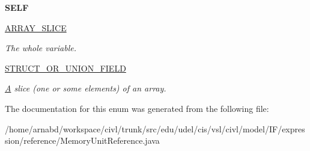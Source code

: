 \begin{DoxyCompactItemize}
\item 
\hypertarget{enumedu_1_1udel_1_1cis_1_1vsl_1_1civl_1_1model_1_1IF_1_1expression_1_1reference_1_1MemoryUnitRef64a306b012808a0db442488810ff9534_a73cad05cb8841a8257e011b8ca34f8e1}{}{\bfseries S\+E\+L\+F}\label{enumedu_1_1udel_1_1cis_1_1vsl_1_1civl_1_1model_1_1IF_1_1expression_1_1reference_1_1MemoryUnitRef64a306b012808a0db442488810ff9534_a73cad05cb8841a8257e011b8ca34f8e1}

\item 
\hypertarget{enumedu_1_1udel_1_1cis_1_1vsl_1_1civl_1_1model_1_1IF_1_1expression_1_1reference_1_1MemoryUnitRef64a306b012808a0db442488810ff9534_a505094c2a9697f44d02c5a1cf858eb4b}{}\hyperlink{enumedu_1_1udel_1_1cis_1_1vsl_1_1civl_1_1model_1_1IF_1_1expression_1_1reference_1_1MemoryUnitRef64a306b012808a0db442488810ff9534_a505094c2a9697f44d02c5a1cf858eb4b}{A\+R\+R\+A\+Y\+\_\+\+S\+L\+I\+C\+E}\label{enumedu_1_1udel_1_1cis_1_1vsl_1_1civl_1_1model_1_1IF_1_1expression_1_1reference_1_1MemoryUnitRef64a306b012808a0db442488810ff9534_a505094c2a9697f44d02c5a1cf858eb4b}

\begin{DoxyCompactList}\small\item\em The whole variable. \end{DoxyCompactList}\item 
\hypertarget{enumedu_1_1udel_1_1cis_1_1vsl_1_1civl_1_1model_1_1IF_1_1expression_1_1reference_1_1MemoryUnitRef64a306b012808a0db442488810ff9534_abcbfb62100872854b061a85ea74d99eb}{}\hyperlink{enumedu_1_1udel_1_1cis_1_1vsl_1_1civl_1_1model_1_1IF_1_1expression_1_1reference_1_1MemoryUnitRef64a306b012808a0db442488810ff9534_abcbfb62100872854b061a85ea74d99eb}{S\+T\+R\+U\+C\+T\+\_\+\+O\+R\+\_\+\+U\+N\+I\+O\+N\+\_\+\+F\+I\+E\+L\+D}\label{enumedu_1_1udel_1_1cis_1_1vsl_1_1civl_1_1model_1_1IF_1_1expression_1_1reference_1_1MemoryUnitRef64a306b012808a0db442488810ff9534_abcbfb62100872854b061a85ea74d99eb}

\begin{DoxyCompactList}\small\item\em \hyperlink{structA}{A} slice (one or some elements) of an array. \end{DoxyCompactList}\end{DoxyCompactItemize}


The documentation for this enum was generated from the following file\+:\begin{DoxyCompactItemize}
\item 
/home/arnabd/workspace/civl/trunk/src/edu/udel/cis/vsl/civl/model/\+I\+F/expression/reference/Memory\+Unit\+Reference.\+java\end{DoxyCompactItemize}
